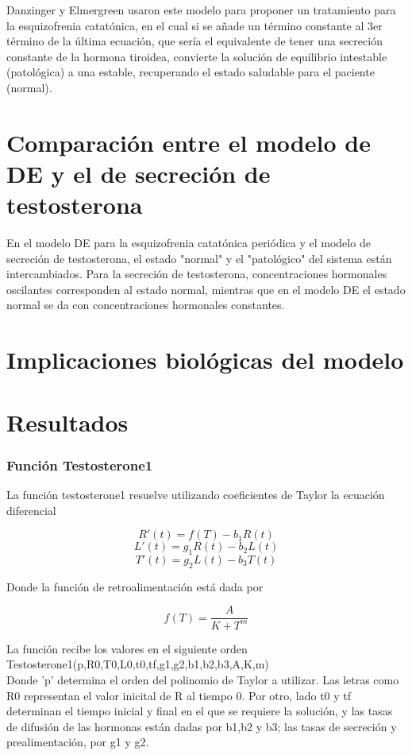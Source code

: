 \documentclass[letter,11pt]{article}
\begin{document}
Danzinger y Elmergreen usaron este modelo para proponer un tratamiento para la esquizofrenia catatónica, en el cual si se añade un término constante al 3er término de la última ecuación, que sería el equivalente de tener una secreción constante de la hormona tiroidea, convierte la solución de equilibrio intestable (patológica) a una estable, recuperando el estado saludable para el paciente (normal). 

\section{Comparación entre el modelo de DE y el de secreción de testosterona}

En el modelo DE para la esquizofrenia catatónica periódica y el modelo de secreción de testosterona, el estado "normal" y el "patológico" del sistema están intercambiados. Para la secreción de testosterona, concentraciones hormonales oscilantes corresponden al estado normal, mientras que en el modelo DE el estado normal se da con concentraciones hormonales constantes.


\section{Implicaciones biológicas del modelo}


\section{Resultados}

\subsubsection{Función Testosterone1}

La función testosterone1 resuelve utilizando coeficientes de Taylor la ecuación diferencial

$$R'(t) = f(T) -b_{1}R(t)$$
$$L'(t) = g_{1}R(t)-b_{2}L(t)$$
$$T'(t) = g_{2}L(t)-b_{3}T(t)$$

Donde la función de retroalimentación está dada por

$$f(T) = \frac{A}{K+T^{m}}$$

La función recibe los valores en el siguiente orden\\

Testosterone1(p,R0,T0,L0,t0,tf,g1,g2,b1,b2,b3,A,K,m)\\

Donde 'p' determina el orden del polinomio de Taylor a utilizar. Las letras como R0 representan el valor inicital de R al tiempo 0. Por otro, lado t0 y tf determinan el tiempo inicial y final en el que se requiere la solución, y las tasas de difusión de las hormonas están dadas por b1,b2 y b3; las tasas de secreción y prealimentación, por g1 y g2.\\
\end{document}
